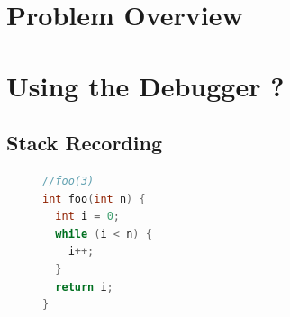 \documentclass[english,submission]{programming}
\begin{document}
\section{Problem Overview}
\label{sec:problem-overview}

\section{Using the Debugger ?}
\label{sec:stack-recording}

\subsection{Stack Recording}

\begin{figure}[h]
  \centering
  \begin{minipage}{0.2\textwidth}
    \begin{lstlisting}[language=C]
//foo(3)
int foo(int n) {
  int i = 0;
  while (i < n) {
    i++;
  }
  return i;
}
    \end{lstlisting}
  \end{minipage}
  \hfill
  \begin{minipage}{0.7\textwidth}
    \begin{tikzpicture}[x=0.75pt,y=0.75pt,yscale=-1.1,xscale=0.95]
      

\end{tikzpicture}
\end{minipage}
\end{figure}
\end{document}

